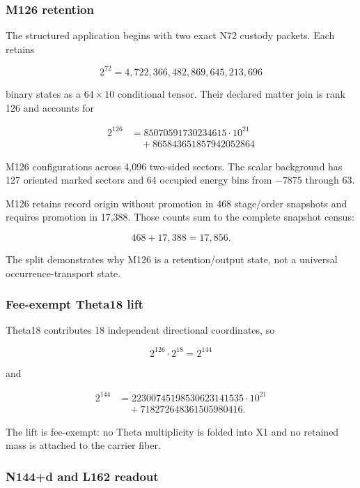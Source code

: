 \subsubsection{M126 retention}\label{viii-ch08-m126-retention}

The structured application begins with two exact N72 custody packets.
Each retains

\[
2^{72}=4{,}722{,}366{,}482{,}869{,}645{,}213{,}696
\]

binary states as a \(64\times10\) conditional tensor. Their declared
matter join is rank 126 and accounts for

\[
\begin{aligned}2^{126}&=85070591730234615\cdot10^{21}\\&\quad+865843651857942052864\end{aligned}
\]

M126 configurations across 4,096 two-sided sectors. The scalar
background has 127 oriented marked sectors and 64 occupied energy bins
from \(-7875\) through 63.

M126 retains record origin without promotion in 468 stage/order
snapshots and requires promotion in 17,388. Those counts sum to the
complete snapshot census:

\[
468+17{,}388=17{,}856.
\]

The split demonstrates why M126 is a retention/output state, not a
universal occurrence-transport state.

\subsubsection{Fee-exempt Theta18 lift}\label{viii-ch08-fee-exempt-theta18-lift}

Theta18 contributes 18 independent directional coordinates, so

\[
2^{126}\cdot2^{18}=2^{144}
\]

and

\[
\begin{aligned}2^{144}&=22300745198530623141535\cdot10^{21}\\&\quad+718272648361505980416.\end{aligned}
\]

The lift is fee-exempt: no Theta multiplicity is folded into X1 and no
retained mass is attached to the carrier fiber.

\subsubsection{N144+d and L162 readout}\label{viii-ch08-n144d-and-l162-readout}

